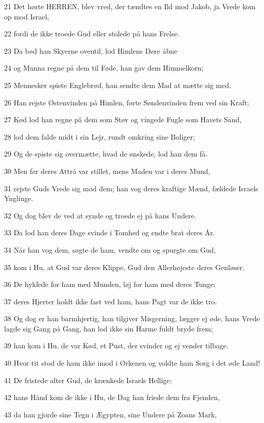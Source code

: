 \par 21 Det hørte HERREN, blev vred, der tændtes en Ild mod Jakob, ja Vrede kom op mod Israel,
\par 22 fordi de ikke troede Gud eller stolede på hans Frelse.
\par 23 Da bød han Skyerne oventil, lod Himlens Døre åbne
\par 24 og Manna regne på dem til Føde, han gav dem Himmelkorn;
\par 25 Mennesker spiste Englebrød, han sendte dem Mad at mætte sig med.
\par 26 Han rejste Østenvinden på Himlen, førte Søndenvinden frem ved sin Kraft;
\par 27 Kød lod han regne på dem som Støv og vingede Fugle som Havets Sand,
\par 28 lod dem falde midt i sin Lejr, rundt omkring sine Boliger;
\par 29 Og de spiste sig overmætte, hvad de ønskede, lod han dem få.
\par 30 Men før deres Attrå var stillet, mens Maden var i deres Mund,
\par 31 rejste Guds Vrede sig mod dem; han vog deres kraftige Mænd, fældede Israels Ynglinge.
\par 32 Og dog blev de ved at synde og troede ej på hans Undere.
\par 33 Da lod han deres Dage svinde i Tomhed og endte brat deres År.
\par 34 Når han vog dem, søgte de ham, vendte om og spurgte om Gud,
\par 35 kom i Hu, at Gud var deres Klippe, Gud den Allerhøjeste deres Genløser.
\par 36 De hyklede for ham med Munden, løj for ham med deres Tunge;
\par 37 deres Hjerter holdt ikke fast ved ham, hans Pagt var de ikke tro.
\par 38 Og dog er han barmhjertig, han tilgiver Misgerning, lægger ej øde, hans Vrede lagde sig Gang på Gang, han lod ikke sin Harme fuldt bryde frem;
\par 39 han kom i Hu, de var Kød, et Pust, der svinder og ej vender tilbage.
\par 40 Hvor tit stod de ham ikke imod i Ørkenen og voldte ham Sorg i det øde Land!
\par 41 De fristede alter Gud, de krænkede Israels Hellige;
\par 42 hans Hånd kom de ikke i Hu, de Dag han friede dem fra Fjenden,
\par 43 da han gjorde sine Tegn i Ægypten, sine Undere på Zoans Mark,
